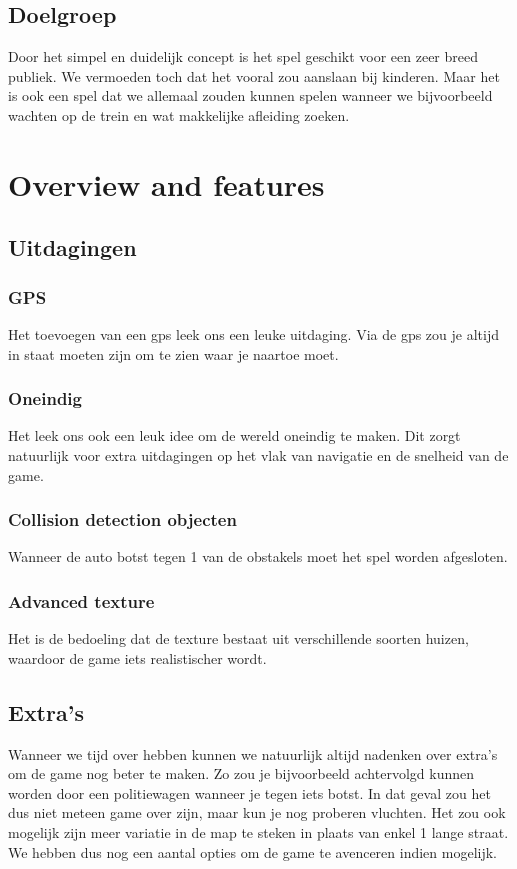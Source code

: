 \documentclass{article}
\begin{document}
\subsection{Doelgroep}
Door het simpel en duidelijk concept is het spel geschikt voor een zeer breed publiek. We vermoeden toch dat het vooral zou aanslaan 
bij kinderen. Maar het is ook een spel dat we allemaal zouden kunnen spelen wanneer we bijvoorbeeld wachten op de trein en wat 
makkelijke afleiding zoeken.
\section{Overview and features}
\subsection{Uitdagingen}

\subsubsection{GPS}
Het toevoegen van een gps leek ons een leuke uitdaging. Via de gps zou je altijd in staat moeten zijn om te zien waar je naartoe moet.
\subsubsection{Oneindig}
Het leek ons ook een leuk idee om de wereld oneindig te maken. Dit zorgt natuurlijk voor extra uitdagingen op het vlak van navigatie en 
de snelheid van de game.
\subsubsection{Collision detection objecten}
Wanneer de auto botst tegen 1 van de obstakels moet het spel worden afgesloten.
\subsubsection{Advanced texture}
Het is de bedoeling dat de texture bestaat uit verschillende soorten huizen, waardoor de game iets realistischer wordt.


\subsection{Extra's}
Wanneer we tijd over hebben kunnen we natuurlijk altijd nadenken over extra's om de game nog beter te maken. Zo zou je bijvoorbeeld 
achtervolgd kunnen worden door een politiewagen wanneer je tegen iets botst. In dat geval zou het dus niet meteen game over zijn, 
maar kun je nog proberen vluchten. Het zou ook mogelijk zijn meer variatie in de map te steken in plaats van enkel 1 lange straat. We 
hebben dus nog een aantal opties om de game te avenceren indien mogelijk.
\end{document}
